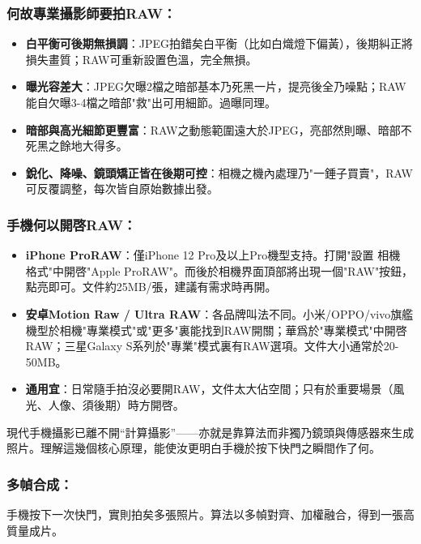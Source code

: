 \subsubsection*{何故專業攝影師要拍RAW：}

\begin{itemize}
  \item \textbf{白平衡可後期無損調}：JPEG拍錯矣白平衡（比如白熾燈下偏黃），後期糾正將損失畫質；RAW可重新設置色溫，完全無損。
  \item \textbf{曝光容差大}：JPEG欠曝2檔之暗部基本乃死黑一片，提亮後全乃噪點；RAW能自欠曝3-4檔之暗部"救"出可用細節。過曝同理。
  \item \textbf{暗部與高光細節更豐富}：RAW之動態範圍遠大於JPEG，亮部然則曝、暗部不死黑之餘地大得多。
  \item \textbf{銳化、降噪、鏡頭矯正皆在後期可控}：相機之機內處理乃"一錘子買賣"，RAW可反覆調整，每次皆自原始數據出發。
\end{itemize}

\subsubsection*{手機何以開啓RAW：}

\begin{itemize}
  \item \textbf{iPhone ProRAW}：僅iPhone 12 Pro及以上Pro機型支持。打開"設置 相機 格式"中開啓"Apple ProRAW"。而後於相機界面頂部將出現一個"RAW"按鈕，點亮即可。文件約25MB/張，建議有需求時再開。
  \item \textbf{安卓Motion Raw / Ultra RAW}：各品牌叫法不同。小米/OPPO/vivo旗艦機型於相機"專業模式"或"更多"裏能找到RAW開關；華爲於"專業模式"中開啓RAW；三星Galaxy S系列於"專業"模式裏有RAW選項。文件大小通常於20-50MB。
  \item \textbf{通用宜}：日常隨手拍沒必要開RAW，文件太大佔空間；只有於重要場景（風光、人像、須後期）時方開啓。
\end{itemize}


現代手機攝影已離不開“計算攝影”——亦就是靠算法而非獨乃鏡頭與傳感器來生成照片。理解這幾個核心原理，能使汝更明白手機於按下快門之瞬間作了何。

\subsubsection*{多幀合成：}

手機按下一次快門，實則拍矣多張照片。算法以多幀對齊、加權融合，得到一張高質量成片。

